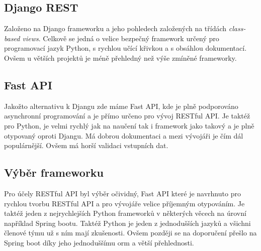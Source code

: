 \subsection{Django REST}\label{sec:api_technologies:django}
Založeno na Django frameworku a jeho pohledech založených na třídách \textit{class-based views}. Celkově se jedná o velice bezpečný framework určený pro programovací jazyk Python, s rychlou učící křivkou a s obsáhlou dokumentací. Ovšem u větších projektů je méně přehledný než výše zmíněné frameworky.

\subsection{Fast API}\label{sec:api_technologies:fast}
Jakožto alternativu k Djangu zde máme Fast API, kde je plně podporováno asynchronní programování a je přímo určeno pro vývoj RESTful API. Je taktéž pro Python, je velmi rychlý jak na naučení tak i framework jako takový a je plně otypovaný oproti Djangu. Má dobrou dokumentaci a mezi vývojáři je čím dál populárnější. Ovšem má horší validaci vstupních dat.


\subsection{Výběr frameworku}\label{sec:api_technologies:summary}
Pro účely RESTful API byl výběr očividný, Fast API které je navrhnuto pro rychlou tvorbu RESTful API a pro vývojáře velice příjemným otypováním. Je taktéž jeden z nejrychlejších Python frameworků v některých věcech na úrovní například Spring bootu.\cite{benchmarks} Taktéž Python je jeden z jednodušších jazyků a všichni členové týmu už s ním mají zkušenosti. Ovšem později se na doporučení přešlo na Spring boot díky jeho jednoduššímu \gls{orm} a větší přehlednosti.